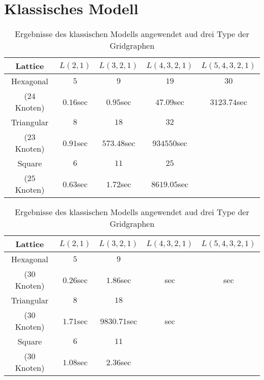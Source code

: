 \documentclass[
	fontsize=12pt,
	paper=a4,
	twoside=false,
	numbers=noenddot,
	plainheadsepline,
	toc=listof,
	toc=bibliography
]{scrartcl}
\begin{document}
\section{Klassisches Modell}
\begin{table}[htbp]
\centering
\begin{tabular}{|c|c|c|c|c|}
\hline 
	Lattice    & $L(2,1)$   & $L(3,2,1)$ & $L(4,3,2,1)$ & $L(5,4,3,2,1)$ \\ \hline 
	Hexagonal  & $5$        & $9$        & $19$         & $30$           \\ 
($24$ Knoten)  & $0.16$sec  & $0.95$sec  & $47.09$sec   & $3123.74$sec   \\ \hline
			   
	Triangular& $8$	        & $18$        &  $32$            &    \\ 
($23$ Knoten) & $0.91$sec   & $573.48$sec &  $934550$sec     &    \\ \hline
			  
	Square    &  $6$	    &  $11$       & $25$         &    \\ 
($25$ Knoten) & $0.63$sec   &  $1.72$sec  & $8619.05$sec & \\ \hline
\end{tabular}
\caption{ Ergebnisse des klassischen Modells angewendet aud drei Type der Gridgraphen} 
\label{Table:T0}
\end{table}

\begin{table}[htbp]
\centering
\begin{tabular}{|c|c|c|c|c|}
\hline 
	Lattice    & $L(2,1)$   & $L(3,2,1)$ & $L(4,3,2,1)$ & $L(5,4,3,2,1)$ \\ \hline 
	
	Hexagonal  & $5$        & $9$        &              &            \\ 
($30$ Knoten)  & $0.26$sec  & $1.86$sec  & sec          & sec   \\ \hline
			   
	Triangular& $8$	        & $18$         &              &    \\ 
($30$ Knoten) & $1.71$sec  & $9830.71$sec &  sec     &    \\ \hline
			  
	Square    & $6$	        & $11$       &              &    \\ 
($30$ Knoten) & $1.08$sec  & $2.36$sec   &             & \\ \hline

\end{tabular}
\caption{ Ergebnisse des klassischen Modells angewendet aud drei Type der Gridgraphen} 
\label{Table:T0}
\end{table}
	
\end{document}
